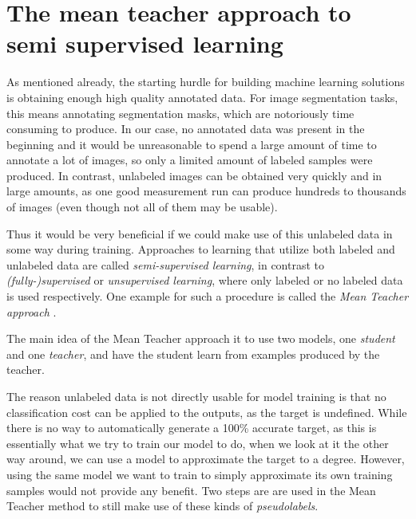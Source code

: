 \section{The mean teacher approach to semi supervised learning}
\label{sec:mean_teacher}

As mentioned already, the starting hurdle for building machine learning solutions is obtaining enough high quality annotated data. 
For image segmentation tasks, this means annotating segmentation masks, which are notoriously time consuming to produce. 
In our case, no annotated data was present in the beginning and it would be unreasonable to spend a large amount of time to annotate a lot of images, so only a limited amount of labeled samples were produced. 
In contrast, unlabeled images can be obtained very quickly and in large amounts, as one good measurement run can produce hundreds to thousands of images (even though not all of them may be usable).

Thus it would be very beneficial if we could make use of this unlabeled data in some way during training. 
Approaches to learning that utilize both labeled and unlabeled data are called \emph{semi-supervised learning}, in contrast to \emph{(fully-)supervised} or \emph{unsupervised learning}, where only labeled or no labeled data is used respectively. 
One example for such a procedure is called the \emph{Mean Teacher approach} \cite{tarvainenMeanTeachersAre2018}.

The main idea of the Mean Teacher approach it to use two models, one \emph{student} and one \emph{teacher}, and have the student learn from examples produced by the teacher.

The reason unlabeled data is not directly usable for model training is that no classification cost can be applied to the outputs, as the target is undefined.
While there is no way to automatically generate a 100\% accurate target, as this is essentially what we try to train our model to do, when we look at it the other way around, we can use a model to approximate the target to a degree.
However, using the same model we want to train to simply approximate its own training samples would not provide any benefit.
Two steps are are used in the Mean Teacher method to still make use of these kinds of \emph{pseudolabels}.

